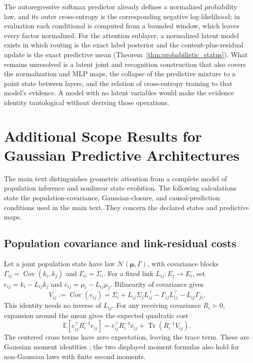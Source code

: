 \documentclass[twoside,11pt]{article}
\begin{document}
The autoregressive softmax predictor already defines a normalized probability law, and its outer cross-entropy is the corresponding negative log-likelihood; in evaluation each conditional is computed from a bounded window, which leaves every factor normalized. For the attention sublayer, a normalized latent model exists in which routing is the exact label posterior and the content-plus-residual update is the exact predictive mean (Theorem~\ref{thm:probabilistic_status}). What remains unresolved is a latent joint and recognition construction that also covers the normalization and MLP maps, the collapse of the predictive mixture to a point state between layers, and the relation of cross-entropy training to that model's evidence. A model with no latent variables would make the evidence identity tautological without deriving those operations.


\section{Additional Scope Results for Gaussian Predictive Architectures}
\label{app:architecture_scope}

The main text distinguishes geometric attention from a complete model of population inference and nonlinear state evolution. The following calculations state the population-covariance, Gaussian-closure, and causal-prediction conditions used in the main text. They concern the declared states and predictive maps.

\subsection{Population covariance and link-residual costs}
\label{sec:population_link_residuals}

Let a joint population state have law
\(\mathcal N(\boldsymbol\mu,\Gamma)\), with covariance blocks
\(\Gamma_{ij}=\operatorname{Cov}(k_i,k_j)\) and
\(\Gamma_{ii}=\Sigma_i\). For a fixed link \(L_{ij}:E_j\to E_i\), set
\(e_{ij}=k_i-L_{ij}k_j\) and
\(\bar e_{ij}=\mu_i-L_{ij}\mu_j\). Bilinearity of covariance gives
\begin{equation}
V_{ij}:=\operatorname{Cov}(e_{ij})
=\Sigma_i+L_{ij}\Sigma_jL_{ij}^{\top}
-\Gamma_{ij}L_{ij}^{\top}-L_{ij}\Gamma_{ji}.
\label{eq:population_residual_covariance}
\end{equation}
This identity needs no inverse of \(L_{ij}\). For any receiving covariance \(R_i\succ0\), expansion around the mean gives the expected quadratic cost
\begin{equation}
\mathbb E[e_{ij}^{\top}R_i^{-1}e_{ij}]
=\bar e_{ij}^{\top}R_i^{-1}\bar e_{ij}
+\operatorname{Tr}(R_i^{-1}V_{ij}).
\label{eq:population_residual_cost}
\end{equation}
The centered cross terms have zero expectation, leaving the trace term. These are Gaussian moment identities \citep{Bishop2006}; the two displayed moment formulas also hold for non-Gaussian laws with finite second moments.
\end{document}
